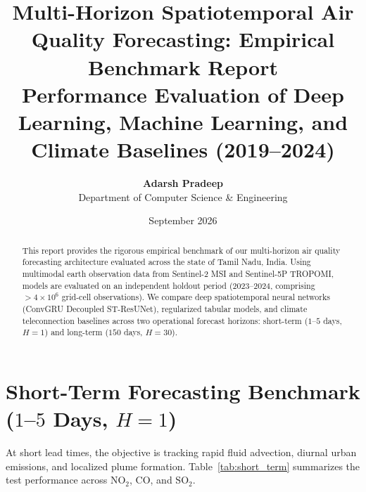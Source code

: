 ﻿\documentclass[10pt,a4paper]{article}
\title{\textbf{\Large Multi-Horizon Spatiotemporal Air Quality Forecasting: Empirical Benchmark Report}\\[0.4ex]
\large Performance Evaluation of Deep Learning, Machine Learning, and Climate Baselines (2019--2024)}
\author{\textbf{Adarsh Pradeep} \\ Department of Computer Science \& Engineering}
\date{September 2026}
\begin{document}
\maketitle

\begin{abstract}
This report provides the rigorous empirical benchmark of our multi-horizon air quality forecasting architecture evaluated across the state of Tamil Nadu, India. Using multimodal earth observation data from Sentinel-2 MSI and Sentinel-5P TROPOMI, models are evaluated on an independent holdout period (2023--2024, comprising $>4\times 10^6$ grid-cell observations). We compare deep spatiotemporal neural networks (ConvGRU Decoupled ST-ResUNet), regularized tabular models, and climate teleconnection baselines across two operational forecast horizons: short-term ($1$--$5$ days, $H=1$) and long-term ($150$ days, $H=30$).
\end{abstract}

\vspace{0.8em}
\section{Short-Term Forecasting Benchmark ($1$--$5$ Days, $H=1$)}
At short lead times, the objective is tracking rapid fluid advection, diurnal urban emissions, and localized plume formation. Table~\ref{tab:short_term} summarizes the test performance across $\text{NO}_2$, $\text{CO}$, and $\text{SO}_2$.
\end{document}
